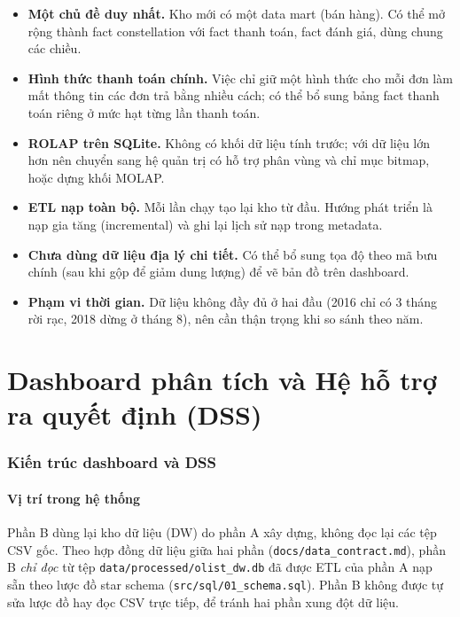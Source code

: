 \documentclass[12pt,a4paper]{article}
\newcommand{\code}[1]{\texttt{\small #1}}
\begin{document}
\begin{itemize}[nosep]
  \item \textbf{Một chủ đề duy nhất.} Kho mới có một data mart (bán hàng). Có thể mở rộng thành fact constellation
        với fact thanh toán, fact đánh giá, dùng chung các chiều.
  \item \textbf{Hình thức thanh toán chính.} Việc chỉ giữ một hình thức cho mỗi đơn làm mất thông tin các đơn trả
        bằng nhiều cách; có thể bổ sung bảng fact thanh toán riêng ở mức hạt từng lần thanh toán.
  \item \textbf{ROLAP trên SQLite.} Không có khối dữ liệu tính trước; với dữ liệu lớn hơn nên chuyển sang hệ quản trị
        có hỗ trợ phân vùng và chỉ mục bitmap, hoặc dựng khối MOLAP.
  \item \textbf{ETL nạp toàn bộ.} Mỗi lần chạy tạo lại kho từ đầu. Hướng phát triển là nạp gia tăng
        (incremental) và ghi lại lịch sử nạp trong metadata.
  \item \textbf{Chưa dùng dữ liệu địa lý chi tiết.} Có thể bổ sung tọa độ theo mã bưu chính (sau khi gộp để giảm
        dung lượng) để vẽ bản đồ trên dashboard.
  \item \textbf{Phạm vi thời gian.} Dữ liệu không đầy đủ ở hai đầu (2016 chỉ có 3 tháng rời rạc, 2018 dừng ở tháng 8), nên cần thận trọng khi
        so sánh theo năm.
\end{itemize}

\clearpage
\part{Dashboard phân tích và Hệ hỗ trợ ra quyết định (DSS)}

\section{Kiến trúc dashboard và DSS}

\subsection{Vị trí trong hệ thống}
Phần B dùng lại kho dữ liệu (DW) do phần A xây dựng, không đọc lại các tệp CSV gốc. Theo hợp đồng dữ liệu
giữa hai phần (\code{docs/data\_contract.md}), phần B \emph{chỉ đọc} từ tệp \code{data/processed/olist\_dw.db}
đã được ETL của phần A nạp sẵn theo lược đồ star schema (\code{src/sql/01\_schema.sql}). Phần B không được
tự sửa lược đồ hay đọc CSV trực tiếp, để tránh hai phần xung đột dữ liệu.
\end{document}
